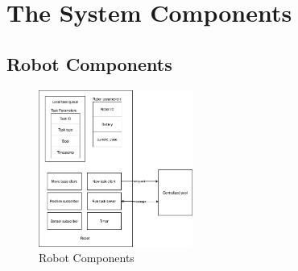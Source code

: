 \section{The System Components}


\subsection{Robot Components}


\begin{figure}[htbp]
	\centering
	\includegraphics[width = 0.45\textwidth]{content/images/ch3/system_component_robot.drawio.png}
	\caption{Robot Components}
	\label{fig:robot_components}
\end{figure}

